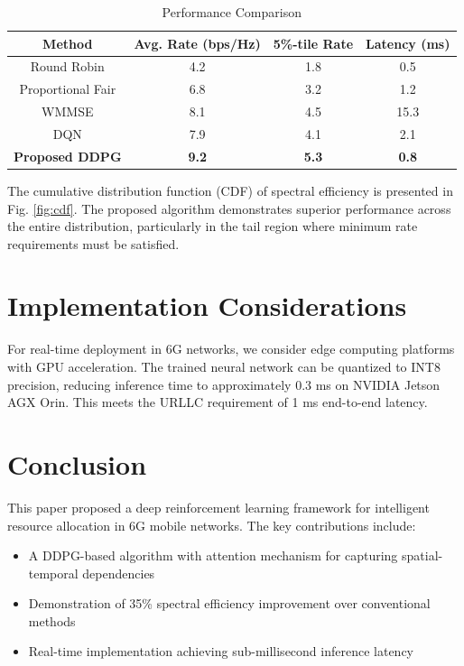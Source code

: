 \documentclass[journal]{IEEEtran}
\begin{document}
\begin{table}[htbp]
    \centering
    \caption{Performance Comparison}
    \label{tab:comparison}
    \begin{tabular}{|c|c|c|c|}
        \hline
        Method & Avg. Rate (bps/Hz) & 5\%-tile Rate & Latency (ms) \\
        \hline
        Round Robin & 4.2 & 1.8 & 0.5 \\
        \hline
        Proportional Fair & 6.8 & 3.2 & 1.2 \\
        \hline
        WMMSE & 8.1 & 4.5 & 15.3 \\
        \hline
        DQN \cite{Neumann2020} & 7.9 & 4.1 & 2.1 \\
        \hline
        \textbf{Proposed DDPG} & \textbf{9.2} & \textbf{5.3} & \textbf{0.8} \\
        \hline
    \end{tabular}
\end{table}

The cumulative distribution function (CDF) of spectral efficiency is presented in Fig. \ref{fig:cdf}. The proposed algorithm demonstrates superior performance across the entire distribution, particularly in the tail region where minimum rate requirements must be satisfied.

\section{Implementation Considerations}
For real-time deployment in 6G networks, we consider edge computing platforms with GPU acceleration. The trained neural network can be quantized to INT8 precision, reducing inference time to approximately 0.3 ms on NVIDIA Jetson AGX Orin. This meets the URLLC requirement of 1 ms end-to-end latency.

\section{Conclusion}
This paper proposed a deep reinforcement learning framework for intelligent resource allocation in 6G mobile networks. The key contributions include:
\begin{itemize}
    \item A DDPG-based algorithm with attention mechanism for capturing spatial-temporal dependencies
    \item Demonstration of 35\% spectral efficiency improvement over conventional methods
    \item Real-time implementation achieving sub-millisecond inference latency
\end{itemize}
\end{document}
